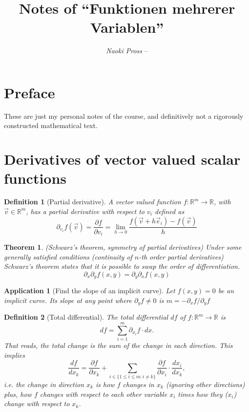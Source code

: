 \documentclass[twocolumn, margin=small]{tex/hsrzf}
\author{\textsl{Naoki Pross} -- \texttt{\theauthoremail}}
\title{Notes of ``Funktionen mehrerer Variablen''}
\date{\thesemester}
\theoremstyle{fuvarzf}
\newtheorem{theorem}{Theorem}
\newtheorem{application}{Application}
\newtheorem{definition}{Definition}
\begin{document}
\maketitle

\section{Preface}

These are just my personal notes of the \themodule{} course, and definitively
not a rigorously constructed mathematical text.

\section{Derivatives of vector valued scalar functions}

\begin{definition}[Partial derivative]
  A vector valued function \(f: \mathbb{R}^m\to\mathbb{R}\), with
  \(\vec{v}\in\mathbb{R}^m\), has a partial derivative with respect to \(v_i\)
  defined as
  \[
    \partial_{v_i} f(\vec{v})
      = \frac{\partial f}{\partial v_i}
      = \lim_{h\to 0} \frac{f(\vec{v} + h\vec{e}_i) - f(\vec{v})}{h}
  \]
\end{definition}

\begin{theorem}(Schwarz's theorem, symmetry of partial derivatives)
  Under some generally satisfied conditions (continuity of \(n\)-th order
  partial derivatives) Schwarz's theorem states that it is possible to swap
  the order of differentiation.
  \[
    \partial_x \partial_y f(x,y) = \partial_y \partial_x f(x,y)
  \]
\end{theorem}

\begin{application}[Find the slope of an implicit curve]
  Let \(f(x,y) = 0\) be an implicit curve. Its slope at any point where
  \(\partial_y f \neq 0\) is \(m = - \partial_x f / \partial_y f\)
\end{application}

\begin{definition}[Total differential]
  The total differential \(df\) of \(f:\mathbb{R}^m\to\mathbb{R}\) is
  \[
    df = \sum_{i=1}^m \partial_{x_i} f\cdot dx .
  \]
  That reads, the \emph{total} change is the sum of the change in each
  direction. This implies
  \[
    \frac{df}{dx_k} = \frac{\partial f}{\partial x_k} + 
      \sum_{i \in \{1 \leq i \leq m : i \neq k\}}
      \frac{\partial f}{\partial x_i} \cdot \frac{dx_i}{dx_k} ,
  \]
  i.e. the change in direction \(x_k\) is how \(f\) changes in \(x_k\)
  (ignoring other directions) plus, how \(f\) changes with respect to each
  other variable \(x_i\) times how they (\(x_i\)) change with respect to \(x_k\).
\end{definition}
\end{document}
